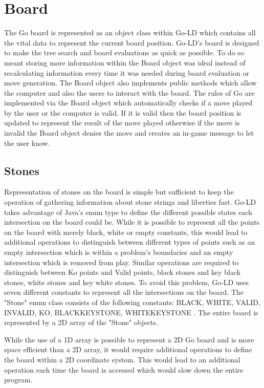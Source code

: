 \documentclass{l4proj}
\begin{document}
\section{Board}

The Go board is represented as an object class within Go-LD which contains all the vital data to represent the current board position. Go-LD's board is designed to make the tree search and board evaluations as quick as possible. To do so meant storing more information within the Board object was ideal instead of recalculating information every time it was needed during board evaluation or move generation. The Board object also implements public methods which allow the computer and also the users to interact with the board. The rules of Go are implemented via the Board object which automatically checks if a move played by the user or the computer is valid. If it is valid then the board position is updated to represent the result of the move played otherwise if the move is invalid the Board object denies the move and creates an in-game message to let the user know.

\subsection{Stones}
Representation of stones on the board is simple but sufficient to keep the operation of gathering information about stone strings and liberties fast. Go-LD takes advantage of Java’s enum type to define the different possible states each intersection on the board could be. While it is possible to represent all the points on the board with merely black, white or empty constants, this would lead to additional operations to distinguish between different types of points such as an empty intersection which is within a problem’s boundaries and an empty intersection which is removed from play. Similar operations are required to distinguish between Ko points and Valid points, black stones and key black stones, white stones and key white stones. To avoid this problem, Go-LD uses seven different constants to represent all the intersections on the board. The "Stone" enum class consists of the following constants: BLACK, WHITE, VALID, INVALID, KO, BLACKKEYSTONE, WHITEKEYSTONE . The entire board is represented by a 2D array of the "Stone" objects.

While the use of a 1D array is possible to represent a 2D Go board and is more space efficient than a 2D array, it would require additional operations to define the board within a 2D coordinate system. This would lead to an additional operation each time the board is accessed which would slow down the entire program.
\end{document}
